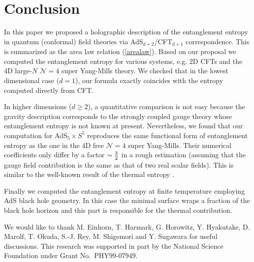 \documentclass[amsmath,amssymb,nofootinbib,eqsecnum,tighten,prd,12pt]{revtex4}
\def\frac#1#2{{#1\over #2}}
\def\f {\frac}
\def\frac#1#2{{#1\over #2}}
\begin{document}
\section{Conclusion}

In this paper we proposed a holographic description of the
entanglement entropy in quantum (conformal) field theories via
AdS$_{d+2}$/CFT$_{d+1}$ correspondence. This is summarized as the area
law relation (\ref{arealaw}). Based on our proposal we computed the
entanglement entropy for various systems,
e.g. 2D CFTs and the 4D
large-$N$ ${\mathcal{N}}=4$ super Yang-Mills theory. We
checked that in the lowest dimensional case ($d=1$), our formula
exactly coincides with the entropy computed directly from CFT.

In higher dimensions ($d\geq 2$),
a quantitative comparison is not easy because the gravity description
corresponds to the strongly coupled gauge theory whose entanglement
entropy is not known at present. Nevertheless, we found that
our computation for AdS$_5\times S^5$ reproduces the same functional
form of entanglement entropy as the one in the 4D free
${\mathcal{N}}=4$ super Yang-Mills. Their numerical coefficients
only differ by a factor $\sim \f{3}{2}$ in a rough estimation (assuming
that the gauge field contribution is the same as that of two
real scalar fields). This is similar to the well-known result of
the thermal entropy \cite{GKP}.

Finally we computed the entanglement entropy at finite temperature
employing AdS black hole geometry. In this case the minimal surface
wraps a fraction of the black hole horizon and this part is
responsible for the thermal contribution.




We would like to thank M. Einhorn, T. Harmark, G. Horowitz, Y. Hyakutake, D.
Marolf, T. Okuda, S.-J. Rey, M. Shigemori and Y. Sugawara for useful
discussions. This research was supported in part by the National
Science Foundation under Grant No.\ PHY99-07949.
\end{document}
